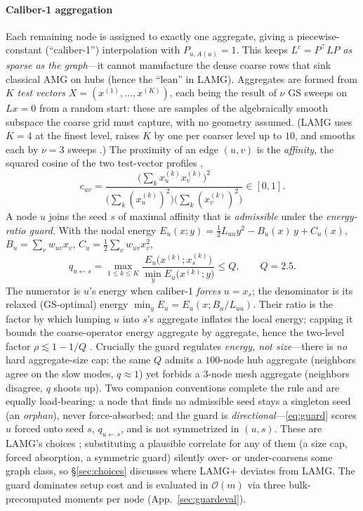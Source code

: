 \documentclass[review]{siamart220329}
\newcommand{\Om}{\mathcal{O}(m)}
\begin{document}
\paragraph{Caliber-1 aggregation} Each remaining node is assigned to exactly one
aggregate, giving a piecewise-constant (``caliber-1'') interpolation with $P_{u,A(u)}=1$.
This keeps $L^c=P^{\top}LP$ \emph{as sparse as the graph}---it cannot manufacture the dense
coarse rows that sink classical AMG on hubs (hence the ``lean'' in LAMG). Aggregates are formed from $K$ \emph{test
vectors} $X=(x^{(1)},\dots,x^{(K)})$, each being the result of $\nu$ GS sweeps on $Lx=0$ from a random start:
these are samples of the algebraically smooth subspace the coarse grid must capture, with
no geometry assumed. (LAMG uses $K=4$ at the finest level, raises $K$ by one per coarser
level up to $10$, and smooths each by $\nu=3$ sweeps \cite[\S4.1]{lamg}.) The proximity of an edge $(u,v)$ is the \emph{affinity}, the squared
cosine of the two test-vector profiles \cite[Eq.~3.3]{lamg},
\begin{equation}\label{eq:aff}
c_{uv}=\frac{\big(\sum_k x^{(k)}_u x^{(k)}_v\big)^2}
{\big(\sum_k (x^{(k)}_u)^2\big)\big(\sum_k (x^{(k)}_v)^2\big)}\in[0,1].
\end{equation}
A node $u$ joins the seed $s$ of maximal affinity that is \emph{admissible} under the
\emph{energy-ratio guard}. With the nodal energy
$E_u(x;y)=\tfrac12 L_{uu}y^2-B_u(x)\,y+C_u(x)$, $B_u=\sum_v w_{uv}x_v$,
$C_u=\tfrac12\sum_v w_{uv}x_v^2$,
\begin{equation}\label{eq:guard}
q_{u\leftarrow s}=\max_{1\le k\le K}
\frac{E_u\!\big(x^{(k)};x^{(k)}_s\big)}{\min_y E_u\!\big(x^{(k)};y\big)}\le Q,\qquad Q=2.5 .
\end{equation}
The numerator is $u$'s energy when caliber-1 \emph{forces} $u=x_s$; the denominator is its
relaxed (GS-optimal) energy $\min_y E_u=E_u(x;B_u/L_{uu})$. Their ratio is the factor by
which lumping $u$ into $s$'s aggregate inflates the local energy; capping it bounds the
coarse-operator energy aggregate by aggregate, hence the two-level factor
$\rho\lesssim 1-1/Q$ \cite[\S3.4]{lamg}. Crucially the guard regulates \emph{energy, not
size}---there is \emph{no} hard aggregate-size cap: the same $Q$ admits a $100$-node hub
aggregate (neighbors agree on the slow modes, $q\approx1$) yet forbids a $3$-node mesh
aggregate (neighbors disagree, $q$ shoots up). Two companion conventions complete the rule
and are equally load-bearing: a node that finds no admissible seed stays a singleton seed (an
\emph{orphan}), never force-absorbed; and the guard is \emph{directional}---\eqref{eq:guard}
scores $u$ forced onto seed $s$, $q_{u\leftarrow s}$, and is not symmetrized in $(u,s)$. These
are LAMG's choices \cite[\S3.4]{lamg}; substituting a plausible correlate for any of them (a
size cap, forced absorption, a symmetric guard) silently over- or under-coarsens some graph
class, so \S\ref{sec:choices} discusses where LAMG+ deviates from LAMG. The guard
dominates setup cost and is evaluated in $\Om$ via three bulk-precomputed moments per node
(App.~\ref{sec:guardeval}).
\end{document}
